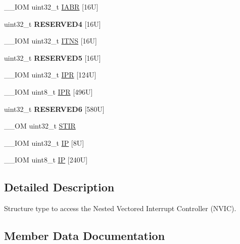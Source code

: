 \begin{DoxyCompactItemize}
\item 
\+\_\+\+\_\+\+I\+OM uint32\+\_\+t \mbox{\hyperlink{struct_n_v_i_c___type_a6e42ca3d9a1e12e75463cef68785d533}{I\+A\+BR}} \mbox{[}16\+U\mbox{]}
\item 
\mbox{\label{struct_n_v_i_c___type_ab7e7cff95dfc1edc0c0dcce4e8345a6a}} 
uint32\+\_\+t {\bfseries R\+E\+S\+E\+R\+V\+E\+D4} \mbox{[}16\+U\mbox{]}
\item 
\+\_\+\+\_\+\+I\+OM uint32\+\_\+t \mbox{\hyperlink{struct_n_v_i_c___type_a4940c96f11d1c95d95a28e388f04d6d6}{I\+T\+NS}} \mbox{[}16\+U\mbox{]}
\item 
\mbox{\label{struct_n_v_i_c___type_ae71fe7b11f01c3702aa6253b5309bbf9}} 
uint32\+\_\+t {\bfseries R\+E\+S\+E\+R\+V\+E\+D5} \mbox{[}16\+U\mbox{]}
\item 
\+\_\+\+\_\+\+I\+OM uint32\+\_\+t \mbox{\hyperlink{struct_n_v_i_c___type_a71598b2d46c2fa6708a7908a1c63c43c}{I\+PR}} \mbox{[}124\+U\mbox{]}
\item 
\+\_\+\+\_\+\+I\+OM uint8\+\_\+t \mbox{\hyperlink{struct_n_v_i_c___type_adfd45d2d45654c4e775017800f33e9a3}{I\+PR}} \mbox{[}496\+U\mbox{]}
\item 
\mbox{\label{struct_n_v_i_c___type_ad91f19091b4eecbe7322cdb36fad41c8}} 
uint32\+\_\+t {\bfseries R\+E\+S\+E\+R\+V\+E\+D6} \mbox{[}580\+U\mbox{]}
\item 
\+\_\+\+\_\+\+OM uint32\+\_\+t \mbox{\hyperlink{struct_n_v_i_c___type_a37de89637466e007171c6b135299bc75}{S\+T\+IR}}
\item 
\+\_\+\+\_\+\+I\+OM uint32\+\_\+t \mbox{\hyperlink{struct_n_v_i_c___type_a4eef47929a0d1317a107f1ac62e28464}{IP}} \mbox{[}8\+U\mbox{]}
\item 
\+\_\+\+\_\+\+I\+OM uint8\+\_\+t \mbox{\hyperlink{struct_n_v_i_c___type_a9a4341692e45d089a113986a3d344e98}{IP}} \mbox{[}240\+U\mbox{]}
\end{DoxyCompactItemize}


\subsection{Detailed Description}
Structure type to access the Nested Vectored Interrupt Controller (N\+V\+IC). 

\subsection{Member Data Documentation}
\mbox{\label{struct_n_v_i_c___type_a6e42ca3d9a1e12e75463cef68785d533}} 
